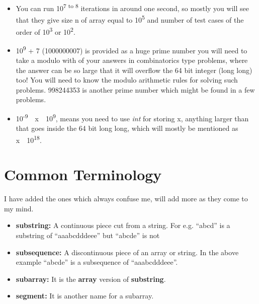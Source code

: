 \documentclass[13pt,oneside,a4paper]{book}
\begin{document}
\begin{itemize}
        \item You can run 10\textsuperscript{7 to 8} iterations in around one second, so
                mostly you will see that they give size n of array equal to 10\textsuperscript{5} 
                and number of test cases of the order of 10\textsuperscript{3} or 10\textsuperscript{2}.
        \item 10\textsuperscript{9} + 7 (1000000007) is provided as a huge prime number you will need
                to take a modulo with of your answers in combinatorics type problems, where the answer can be so large
                that it will overflow the 64 bit integer (long long) too! You will need to know the modulo
                arithmetic rules for solving such problems. 998244353 is another prime number which might be
                found in a few problems.
        \item 10\textsuperscript{-9}~\leq~x~\leq~10\textsuperscript{9}, means you need to use \textit{int} for storing x, anything
                larger than that goes inside the 64 bit long long, which will mostly be mentioned as x~\leq~10\textsuperscript{18}.
\end{itemize}

\section{Common Terminology}

I have added the ones which always confuse me, will add more as
they come to my mind.

\begin{itemize}
        \item \textbf{substring:} A continuous piece cut from a string. For e.g. ``abcd'' is a substring of ``aaabcdddeee'' but ``abcde'' is not
        \item \textbf{subsequence:} A discontinuous piece of an array or string. In the above example ``abcde'' is a subsequence of ``aaabcdddeee''.
        \item \textbf{subarray:} It is the \textbf{array} version of \textbf{substring}.
        \item \textbf{segment:} It is another name for a subarray.
\end{itemize}
\end{document}
